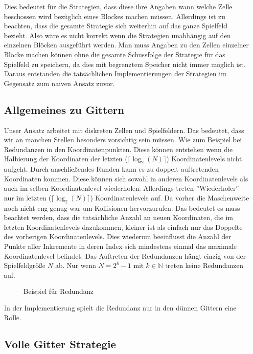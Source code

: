 \documentclass[a4paper,12pt]{llncs}
\numberwithin{equation}{section}
\begin{document}
Dies bedeutet für die Strategien, dass diese ihre Angaben wann welche Zelle beschossen wird bezüglich eines Blockes machen müssen. Allerdings ist zu beachten, dass die gesamte Strategie sich weiterhin auf das ganze Spielfeld bezieht. Also wäre es nicht korrekt wenn die Strategien unabhängig auf den einzelnen Blöcken ausgeführt werden. Man muss Angaben zu den Zellen einzelner Blöcke machen können ohne die gesamte Schussfolge der Strategie für das Spielfeld zu speichern, da dies mit begrenztem Speicher nicht immer möglich ist. Daraus entstanden die tatsächlichen Implementierungen der Strategien im Gegensatz zum naiven Ansatz zuvor.

\subsection{Allgemeines zu Gittern}

Unser Ansatz arbeitet mit diskreten Zellen und Spielfeldern. Das bedeutet, dass wir an manchen Stellen besonders vorsichtig sein müssen. Wie zum Beispiel bei Redundanzen in den Koordinatenpunkten. Diese können entstehen wenn die Halbierung der Koordinaten der letzten ($\lceil\log_2(N)\rceil$) Koordinatenlevels nicht aufgeht. Durch anschließendes Runden kann es zu doppelt auftretenden Koordinaten kommen. Diese können sich sowohl in anderen Koordinatenlevels als auch im selben Koordinatenlevel wiederholen. Allerdings treten ''Wiederholer'' nur im letzten ($\lceil\log_2(N)\rceil$) Koordinatenlevels auf. Da vorher die Maschenweite noch nicht eng genug war um Kollisionen hervorzurufen. Das bedeutet es muss beachtet werden, dass die tatsächliche Anzahl an neuen Koordinaten, die im letzten Koordinatenlevels dazukommen, kleiner ist als einfach nur das Doppelte des vorherigen Koordinatenlevels. Dies wiederum beeinflusst die Anzahl der Punkte aller Inkremente in deren Index sich mindestens einmal das maximale Koordinatenlevel befindet. Das Auftreten der Redundanzen hängt einzig von der Spielfeldgröße $N$ ab. Nur wenn $N = 2^k-1$ mit $k\in\mathbb{N}$ treten keine Redundanzen auf.

\begin{figure}
	\centering
	\resizebox{.90\linewidth}{!}{}
	\caption{Beispiel für Redundanz}
	\label{fig:redundancy}
\end{figure}

In der Implementierung spielt die Redundanz nur in den dünnen Gittern eine Rolle.


\subsection{Volle Gitter Strategie}
\end{document}
